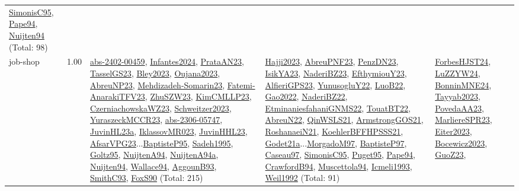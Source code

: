 {\begin{longtable}{p{3cm}r>{\raggedright\arraybackslash}p{6cm}>{\raggedright\arraybackslash}p{6cm}>{\raggedright\arraybackslash}p{8cm}}
\hyperref[detail:SimonisC95]{SimonisC95}, \hyperref[detail:Pape94]{Pape94}, \hyperref[detail:Nuijten94]{Nuijten94} (Total: 98)\\
\index{job-shop}\index{Concepts!job-shop}job-shop &  1.00 & \hyperref[detail:abs-2402-00459]{abs-2402-00459}, \hyperref[detail:Infantes2024]{Infantes2024}, \hyperref[detail:PrataAN23]{PrataAN23}, \hyperref[detail:TasselGS23]{TasselGS23}, \hyperref[detail:Bley2023]{Bley2023}, \hyperref[detail:Oujana2023]{Oujana2023}, \hyperref[detail:AbreuNP23]{AbreuNP23}, \hyperref[detail:Mehdizadeh-Somarin23]{Mehdizadeh-Somarin23}, \hyperref[detail:Fatemi-AnarakiTFV23]{Fatemi-AnarakiTFV23}, \hyperref[detail:ZhuSZW23]{ZhuSZW23}, \hyperref[detail:KimCMLLP23]{KimCMLLP23}, \hyperref[detail:CzerniachowskaWZ23]{CzerniachowskaWZ23}, \hyperref[detail:Schweitzer2023]{Schweitzer2023}, \hyperref[detail:YuraszeckMCCR23]{YuraszeckMCCR23}, \hyperref[detail:abs-2306-05747]{abs-2306-05747}, \hyperref[detail:JuvinHL23a]{JuvinHL23a}, \hyperref[detail:IklassovMR023]{IklassovMR023}, \hyperref[detail:JuvinHHL23]{JuvinHHL23}, \hyperref[detail:AfsarVPG23]{AfsarVPG23}...\hyperref[detail:BaptisteP95]{BaptisteP95}, \hyperref[detail:Sadeh1995]{Sadeh1995}, \hyperref[detail:Goltz95]{Goltz95}, \hyperref[detail:NuijtenA94]{NuijtenA94}, \hyperref[detail:NuijtenA94a]{NuijtenA94a}, \hyperref[detail:Nuijten94]{Nuijten94}, \hyperref[detail:Wallace94]{Wallace94}, \hyperref[detail:AggounB93]{AggounB93}, \hyperref[detail:SmithC93]{SmithC93}, \hyperref[detail:FoxS90]{FoxS90} (Total: 215) & \hyperref[detail:Hajji2023]{Hajji2023}, \hyperref[detail:AbreuPNF23]{AbreuPNF23}, \hyperref[detail:PenzDN23]{PenzDN23}, \hyperref[detail:IsikYA23]{IsikYA23}, \hyperref[detail:NaderiBZ23]{NaderiBZ23}, \hyperref[detail:EfthymiouY23]{EfthymiouY23}, \hyperref[detail:AlfieriGPS23]{AlfieriGPS23}, \hyperref[detail:YunusogluY22]{YunusogluY22}, \hyperref[detail:LuoB22]{LuoB22}, \hyperref[detail:Gao2022]{Gao2022}, \hyperref[detail:NaderiBZ22]{NaderiBZ22}, \hyperref[detail:EtminaniesfahaniGNMS22]{EtminaniesfahaniGNMS22}, \hyperref[detail:TouatBT22]{TouatBT22}, \hyperref[detail:AbreuN22]{AbreuN22}, \hyperref[detail:QinWSLS21]{QinWSLS21}, \hyperref[detail:ArmstrongGOS21]{ArmstrongGOS21}, \hyperref[detail:RoshanaeiN21]{RoshanaeiN21}, \hyperref[detail:KoehlerBFFHPSSS21]{KoehlerBFFHPSSS21}, \hyperref[detail:Godet21a]{Godet21a}...\hyperref[detail:MorgadoM97]{MorgadoM97}, \hyperref[detail:BaptisteP97]{BaptisteP97}, \hyperref[detail:Caseau97]{Caseau97}, \hyperref[detail:SimonisC95]{SimonisC95}, \hyperref[detail:Puget95]{Puget95}, \hyperref[detail:Pape94]{Pape94}, \hyperref[detail:CrawfordB94]{CrawfordB94}, \hyperref[detail:Muscettola94]{Muscettola94}, \hyperref[detail:Icmeli1993]{Icmeli1993}, \hyperref[detail:Weil1992]{Weil1992} (Total: 91) & \hyperref[detail:ForbesHJST24]{ForbesHJST24}, \hyperref[detail:LuZZYW24]{LuZZYW24}, \hyperref[detail:BonninMNE24]{BonninMNE24}, \hyperref[detail:Tayyab2023]{Tayyab2023}, \hyperref[detail:PovedaAA23]{PovedaAA23}, \hyperref[detail:MarliereSPR23]{MarliereSPR23}, \hyperref[detail:Eiter2023]{Eiter2023}, \hyperref[detail:Bocewicz2023]{Bocewicz2023}, \hyperref[detail:GuoZ23]{GuoZ23}, 
\end{longtable}}

